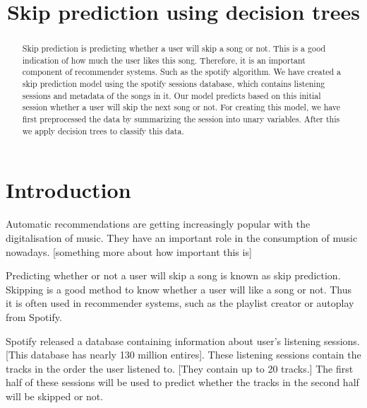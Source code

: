 \documentclass[conference]{IEEEtran}
\begin{document}
\title{Skip prediction using decision trees\\}

\author{
}

\maketitle

\begin{abstract}
	Skip prediction is predicting whether a user will skip a song or not. 
	This is a good indication of how much the user likes this song.
	Therefore, it is an important component of recommender systems. Such as the spotify algorithm. 
	We have created a skip prediction model using the spotify sessions database, 
	which contains listening sessions and metadata of the songs in it. 
	Our model predicts based on this initial session whether a user will skip the next song or not.
	For creating this model, we have first preprocessed the data by summarizing the session into unary variables. 
	After this we apply decision trees to classify this data.
	
	
	
\end{abstract}

\section{Introduction}
Automatic recommendations are getting increasingly popular with the digitalisation of music. They have an important role in the consumption of music nowadays. [something more about how important this is]

Predicting whether or not a user will skip a song is known as skip prediction. 
Skipping is a good method to know whether a user will like a song or not. 
Thus it is often used in recommender systems, 
such as the playlist creator or autoplay from Spotify. 

Spotify released a database containing information about user's listening sessions. 
[This database has nearly 130 million entires]. 
These listening sessions contain the tracks in the order the user listened to. [They contain up to 20 tracks.]
The first half of these sessions will be used to predict whether the tracks in the second half will be skipped or not. 
\end{document}
